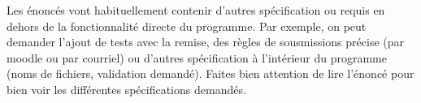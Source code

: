 Les énoncés vont habituellement contenir d'autres spécification ou requis en dehors de la fonctionnalité directe du programme. Par exemple, on peut demander l'ajout de tests avec la remise, des règles de sousmissions précise (par moodle ou par courriel) ou d'autres spécification à l'intérieur du programme (noms de fichiers, validation demandé). Faites bien attention de lire l'énoncé pour bien voir les différentes spécifications demandés.